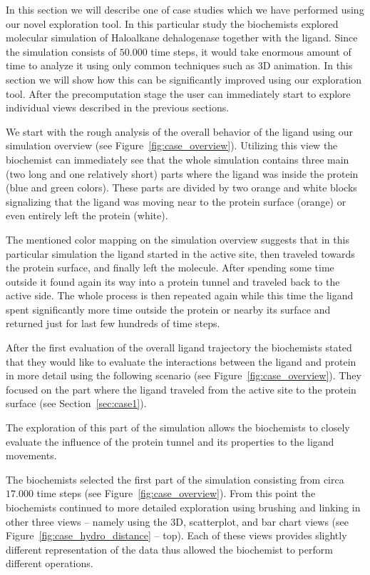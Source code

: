 \documentclass[twocolumn]{bmcart}%
\begin{document}
In this section we will describe one of case studies which we have performed using our novel exploration tool.
In this particular study the biochemists explored molecular simulation of Haloalkane dehalogenase together with the ligand. 
Since the simulation consists of $50.000$ time steps, it would take enormous amount of time to analyze it using only common techniques such as 3D animation.
In this section we will show how this can be significantly improved using our exploration tool.
After the precomputation stage the user can immediately start to explore individual views described in the previous sections.

We start with the rough analysis of the overall behavior of the ligand using our simulation overview (see Figure~\ref{fig:case_overview}).
Utilizing this view the biochemist can immediately see that the whole simulation contains three main (two long and one relatively short) parts where the ligand was inside the protein (blue and green colors).
These parts are divided by two orange and white blocks signalizing that the ligand was moving near to the protein surface (orange) or even entirely left the protein (white).
 
The mentioned color mapping on the simulation overview suggests that in this particular simulation the ligand started in the active site, then traveled towards the protein surface, and finally left the molecule.
After spending some time outside it found again its way into a protein tunnel and traveled back to the active side.
The whole process is then repeated again while this time the ligand spent significantly more time outside the protein or nearby its surface and returned just for last few hundreds of time steps. 

After the first evaluation of the overall ligand trajectory the biochemists stated that they would like to evaluate the interactions between the ligand and protein in more detail using the following scenario (see Figure~\ref{fig:case_overview}). 
They focused on the part where the ligand traveled from the active site to the protein surface (see Section~\ref{sec:case1}). 

The exploration of this part of the simulation allows the biochemists to closely evaluate the influence of the protein tunnel and its properties to the ligand movements.

The biochemists selected the first part of the simulation consisting from circa $17.000$ time steps (see Figure~\ref{fig:case_overview}). 
From this point the biochemists continued to more detailed exploration using brushing and linking in other three views -- namely using the 3D, scatterplot, and bar chart views (see Figure~\ref{fig:case_hydro_distance} -- top).
Each of these views provides slightly different representation of the data thus allowed the biochemist to perform different operations.
\end{document}
